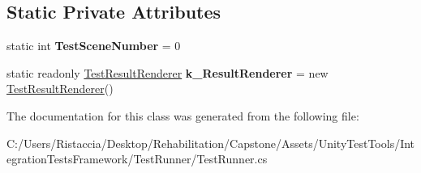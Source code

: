 \subsection*{Static Private Attributes}
\begin{DoxyCompactItemize}
\item 
\mbox{\label{class_unity_test_1_1_test_runner_a3ec7e180f403fa575425a0708701798a}} 
static int {\bfseries Test\+Scene\+Number} = 0
\item 
\mbox{\label{class_unity_test_1_1_test_runner_ab223ee199ec62491215777e4f9a4e692}} 
static readonly \hyperlink{class_test_result_renderer}{Test\+Result\+Renderer} {\bfseries k\+\_\+\+Result\+Renderer} = new \hyperlink{class_test_result_renderer}{Test\+Result\+Renderer}()
\end{DoxyCompactItemize}


The documentation for this class was generated from the following file\+:\begin{DoxyCompactItemize}
\item 
C\+:/\+Users/\+Ristaccia/\+Desktop/\+Rehabilitation/\+Capstone/\+Assets/\+Unity\+Test\+Tools/\+Integration\+Tests\+Framework/\+Test\+Runner/Test\+Runner.\+cs\end{DoxyCompactItemize}
